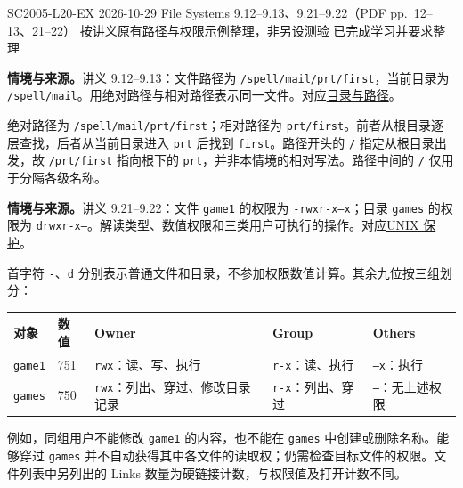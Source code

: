 \begingroup
\renewcommand{\recordid}[1]{}
\renewcommand{\relatedtopic}[2]{\hyperref[topic:#1]{#2}}

\examplemeta
  {SC2005-L20-EX}
  {2026-10-29}
  {File Systems 9.12--9.13、9.21--9.22（PDF pp.~12--13、21--22）}
  {按讲义原有路径与权限示例整理，非另设测验}
  {已完成学习并要求整理}

\linespread{1.15}\selectfont
\setlength{\parskip}{0.4em}

\textbf{情境与来源。}讲义 9.12--9.13：文件路径为 \nolinkurl{/spell/mail/prt/first}，当前目录为 \nolinkurl{/spell/mail}。用绝对路径与相对路径表示同一文件。对应\relatedtopic{SC2005-L20-T02}{目录与路径}。

\begin{workedsolution}
绝对路径为 \texttt{/spell/mail/prt/first}；相对路径为 \texttt{prt/first}。前者从根目录逐层查找，后者从当前目录进入 \texttt{prt} 后找到 \texttt{first}。路径开头的 \texttt{/} 指定从根目录出发，故 \texttt{/prt/first} 指向根下的 \texttt{prt}，并非本情境的相对写法。路径中间的 \texttt{/} 仅用于分隔各级名称。
\end{workedsolution}

\textbf{情境与来源。}讲义 9.21--9.22：文件 \texttt{game1} 的权限为 \texttt{-rwxr-x--x}；目录 \texttt{games} 的权限为 \texttt{drwxr-x---}。解读类型、数值权限和三类用户可执行的操作。对应\relatedtopic{SC2005-L20-T03}{UNIX 保护}。

\begin{workedsolution}
首字符 \texttt{-}、\texttt{d} 分别表示普通文件和目录，不参加权限数值计算。其余九位按三组划分：
\begin{center}
\begin{tabularx}{\textwidth}{@{}ll>{\raggedright\arraybackslash}X>{\raggedright\arraybackslash}X>{\raggedright\arraybackslash}X@{}}
\toprule
对象 & 数值 & Owner & Group & Others \\
\midrule
\texttt{game1} & 751 & \texttt{rwx}：读、写、执行 & \texttt{r-x}：读、执行 & \texttt{--x}：执行 \\
\texttt{games} & 750 & \texttt{rwx}：列出、穿过、修改目录记录 & \texttt{r-x}：列出、穿过 & \texttt{---}：无上述权限 \\
\bottomrule
\end{tabularx}
\end{center}
例如，同组用户不能修改 \texttt{game1} 的内容，也不能在 \texttt{games} 中创建或删除名称。能够穿过 \texttt{games} 并不自动获得其中各文件的读取权；仍需检查目标文件的权限。文件列表中另列出的 Links 数量为硬链接计数，与权限值及打开计数不同。
\end{workedsolution}
\endgroup
